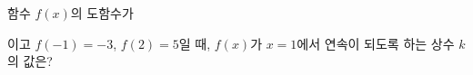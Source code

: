함수 $f(x)$의 도함수가 \par\smallskip{}\par\smallskip\noindent 이고 $f(-1)=-3$, $f(2)=5$일 때, $f(x)$가 $x=1$에서 연속이 되도록 하는 상수 $k$의 값은?
